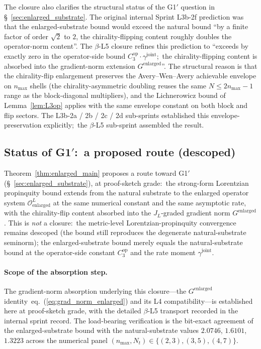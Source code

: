 \documentclass[11pt,a4paper]{article}
\theoremstyle{plain}
\theoremstyle{definition}
\newcommand{\nmax}{n_{\max}}
\newcommand{\Nt}{N_{t}}
\newcommand{\Op}{\mathcal{O}}
\newcommand{\JL}{J_{L}}
\newcommand{\gammajoint}{\gamma^{\mathrm{joint}}}
\newcommand{\Cthreeop}{C_{3}^{\mathrm{op}}}
\begin{document}
The closure also clarifies the structural status of the
G1$'$ question in \S~\ref{sec:enlarged_substrate}. The original
internal Sprint L3b-2f prediction was that the enlarged-substrate
bound would exceed the natural bound ``by a finite factor of order
$\sqrt{2}$ to $2$, the chirality-flipping content roughly doubles
the operator-norm content''. The $\beta$-L5 closure refines this
prediction to ``exceeds by exactly zero in the operator-side bound
$\Cthreeop \cdot \gammajoint$;\ the chirality-flipping content is
absorbed into the gradient-norm extension $G^{\mathrm{enlarged}}$''.
The structural reason is that the chirality-flip enlargement
preserves the Avery--Wen--Avery achievable envelope on $\nmax$ shells
(the chirality-asymmetric doubling reuses the same $N \le 2\nmax - 1$
range as the block-diagonal multipliers), and the Lichnerowicz bound
of Lemma~\ref{lem:L3op} applies with the same envelope constant on
both block and flip sectors. The L3b-2a / 2b / 2c / 2d sub-sprints
established this envelope-preservation explicitly;\ the $\beta$-L5
sub-sprint assembled the result.

\subsection{Status of G1$'$:\ a proposed route (descoped)}
\label{app:enlarged_status}

Theorem~\ref{thm:enlarged_main} proposes a route toward G1$'$
(\S~\ref{sec:enlarged_substrate}), at proof-sketch grade:\ the
strong-form Lorentzian
propinquity bound extends from the natural substrate to the enlarged
operator system $\Op^{L}_{\mathrm{enlarged}}$ at the same numerical
constant and the same asymptotic rate, with the chirality-flip
content absorbed into the $\JL$-graded gradient norm
$G^{\mathrm{enlarged}}$. This is \emph{not} a closure:\ the metric-level
Lorentzian-propinquity convergence remains descoped (the bound still
reproduces the degenerate natural-substrate seminorm); the
enlarged-substrate bound merely equals the natural-substrate bound at
the operator-side constant $\Cthreeop$ and the rate
moment $\gammajoint$.

\paragraph{Scope of the absorption step.} The gradient-norm
absorption underlying this closure---the $G^{\mathrm{enlarged}}$
identity~eq.~(\ref{eq:grad_norm_enlarged}) and its L4
compatibility---is established here at proof-sketch grade, with the
detailed $\beta$-L5 transport recorded in the internal sprint record.
The load-bearing verification is the bit-exact agreement of the
enlarged-substrate bound with the natural-substrate values
$2.0746$, $1.6101$, $1.3223$ across the numerical panel
$(\nmax, \Nt) \in \{(2, 3), (3, 5), (4, 7)\}$.
\end{document}
